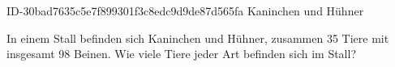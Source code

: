\begin{exercise}
      {ID-30bad7635c5e7f899301f3c8edc9d9de87d565fa}
      {Kaninchen und Hühner}
  \ifproblem\problem\par
    In einem Stall befinden sich Kaninchen und Hühner, zusammen 35 Tiere mit
    insgesamt 98 Beinen. Wie viele Tiere jeder Art befinden sich im Stall?
  \fi
\end{exercise}
